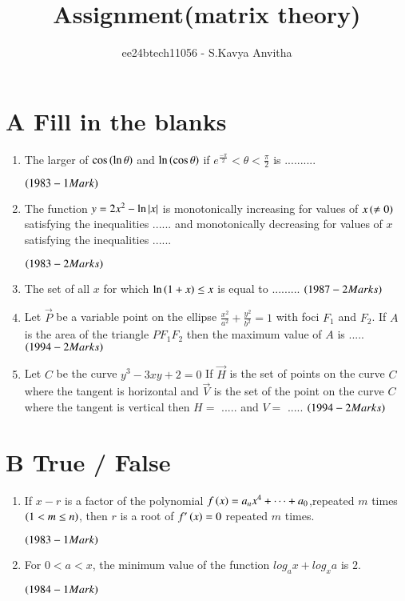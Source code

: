 \documentclass[journal,12pt,onecolumn]{IEEEtran}
\theoremstyle{remark}
\begin{document}

\vspace{3cm}

\title{Assignment(matrix theory)}
\author{ee24btech11056 - S.Kavya Anvitha}
\maketitle
\section{A Fill in the blanks}

\begin{enumerate}
\item The larger of $\cos \left(\ln \theta\right)$ and 
$\ln \left(\cos \theta\right)$ if  $e^{\frac{-\pi}{2}}< \theta< \frac{\pi}{2}$
is ..........

\hfill$\left(1983 - 1 Mark\right)$


\item The function $y=2x^{2}-\ln \left\vert x\right\vert$
is monotonically increasing for values of $x\left(\neq0\right)$ satisfying
the inequalities ...... and monotonically decreasing for values of $x$
satisfying the inequalities  ......

\hfill$\left(1983 - 2 Marks\right)$
	
\item The set of all $x$ for which $\ln \left(1+x\right) \leq x$
is equal to .........
\hfill$\left(1987 - 2 Marks\right)$

\item Let $\vec P$ be a variable point on the ellipse
$\frac{x^2}{a^2}+\frac{y^2}{b^2} = 1$
with foci $F_1$ and $F_2$. If $A$ is the area of the triangle $PF_1F_2$ 
then the maximum value of $A$ is .....
\hfill$\left(1994 - 2 Marks\right)$

\item Let $C$ be the curve $y^3 - 3xy + 2 = 0$ If $\vec H$ is the set 
of points on the curve $C$ where the tangent is horizontal and $\vec V$ is
the set of the point on the curve $C$ where the tangent is vertical
then $H =$ ..... and $V =$ .....
\hfill$\left(1994 - 2 Marks\right)$
\end{enumerate}

\section{B True / False}

\begin{enumerate}

\item If $x-r$ is a factor of the polynomial
$f\left(x\right) = a_{n}x^{4}+\dots+a_{0}$,repeated $m$ times $\left(1< m\leq n\right)$, 
then $r$ is a root of $f^\prime\left(x\right)=0$ repeated $m$ times.

\hfill$\left(1983 - 1 Mark\right)$

\item For $0 < a < x$, the minimum value of the function 
$log_a x + log_x a$ is $2$. 

\hfill$\left(1984 - 1 Mark\right)$

\end{enumerate}
\end{document}
